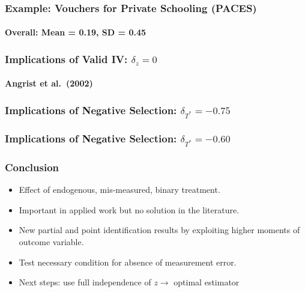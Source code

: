 \documentclass{beamer}
\begin{document}
\begin{frame}
  \frametitle{Example: Vouchers for Private Schooling (PACES)}
  \framesubtitle{Overall: Mean = 0.19, SD = 0.45}
\begin{figure}[h]
  \scriptsize
  \begingroup
  \centering
  
  \endgroup
\end{figure}
\end{frame}
\begin{frame}
  \frametitle{Implications of Valid IV: $\delta_z = 0$}
  \framesubtitle{Angrist et al.\ (2002)}
\begin{figure}[h]
  \scriptsize
  \begingroup
  \centering
  
  \endgroup
\end{figure}
\end{frame}
\begin{frame}
  \frametitle{Implications of Negative Selection: $\delta_{T^*} = -0.75$}
\begin{figure}[h]
  \scriptsize
  \begingroup
  \centering
  
  \endgroup
\end{figure}
\end{frame}
\begin{frame}
  \frametitle{Implications of Negative Selection: $\delta_{T^*} = -0.60$}
\begin{figure}[h]
  \scriptsize
  \begingroup
  \centering
  
  \endgroup
\end{figure}
\end{frame}
\begin{frame}
  \frametitle{Conclusion}
  \begin{itemize}
    \item Effect of endogenous, mis-measured, binary treatment.
    \item Important in applied work but no solution in the literature.
    \item New partial and point identification results by exploiting higher moments of outcome variable.
    \item Test necessary condition for absence of measurement error.
    \item Next steps: use full independence of $z \rightarrow$ optimal estimator
  \end{itemize}
\end{frame}
\end{document}
